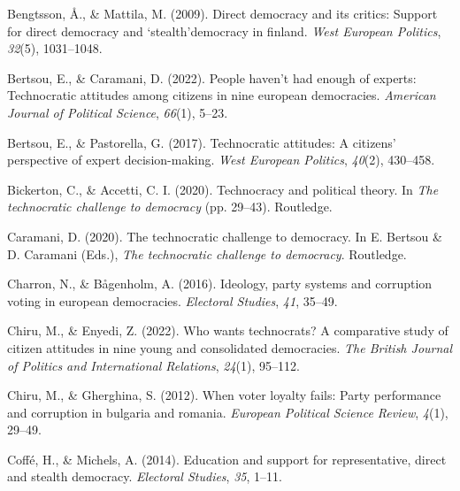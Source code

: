 \documentclass[
  12pt,
  english,
]{article}
\newlength{\cslhangindent}
\newlength{\cslentryspacingunit} %
\newenvironment{CSLReferences}[2] %
 {%
  \setlength{\parindent}{0pt}
  \ifodd #1
  \let\oldpar\par
  \def\par{\hangindent=\cslhangindent\oldpar}
  \fi
  \setlength{\parskip}{#2\cslentryspacingunit}
 }%
 {}
\begin{document}
\hypertarget{refs}{}
\begin{CSLReferences}{1}{0}
\leavevmode{}%
Bengtsson, Å., \& Mattila, M. (2009). Direct democracy and its critics:
Support for direct democracy and `stealth'democracy in finland.
\emph{West European Politics}, \emph{32}(5), 1031--1048.

\leavevmode{}%
Bertsou, E., \& Caramani, D. (2022). People haven't had enough of
experts: Technocratic attitudes among citizens in nine european
democracies. \emph{American Journal of Political Science}, \emph{66}(1),
5--23.

\leavevmode{}%
Bertsou, E., \& Pastorella, G. (2017). Technocratic attitudes: A
citizens' perspective of expert decision-making. \emph{West European
Politics}, \emph{40}(2), 430--458.

\leavevmode{}%
Bickerton, C., \& Accetti, C. I. (2020). Technocracy and political
theory. In \emph{The technocratic challenge to democracy} (pp. 29--43).
Routledge.

\leavevmode{}%
Caramani, D. (2020). The technocratic challenge to democracy. In E.
Bertsou \& D. Caramani (Eds.), \emph{The technocratic challenge to
democracy}. Routledge.

\leavevmode{}%
Charron, N., \& Bågenholm, A. (2016). Ideology, party systems and
corruption voting in european democracies. \emph{Electoral Studies},
\emph{41}, 35--49.

\leavevmode{}%
Chiru, M., \& Enyedi, Z. (2022). Who wants technocrats? A comparative
study of citizen attitudes in nine young and consolidated democracies.
\emph{The British Journal of Politics and International Relations},
\emph{24}(1), 95--112.

\leavevmode{}%
Chiru, M., \& Gherghina, S. (2012). When voter loyalty fails: Party
performance and corruption in bulgaria and romania. \emph{European
Political Science Review}, \emph{4}(1), 29--49.

\leavevmode{}%
Coffé, H., \& Michels, A. (2014). Education and support for
representative, direct and stealth democracy. \emph{Electoral Studies},
\emph{35}, 1--11.


\end{CSLReferences}
\end{document}
